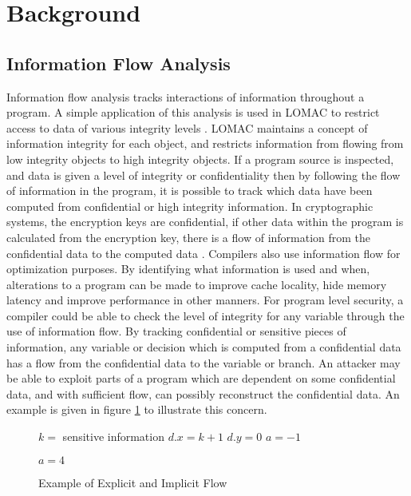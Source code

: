 \section{Background}
\subsection{Information Flow Analysis}
Information flow analysis tracks interactions of information throughout a
program. A simple application of this analysis is used in LOMAC to restrict
access to data of various integrity levels \cite{fraser2000lomac}. LOMAC
maintains a concept of information integrity for each object, and restricts
information from flowing from low integrity objects to high integrity objects.
If a program source is inspected, and data is given a level of integrity or
confidentiality then by following the flow of information in the program, it is
possible to track which data have been computed from confidential or high
integrity information. In cryptographic systems, the encryption keys are
confidential, if other data within the program is calculated from the encryption
key, there is a flow of information from the confidential data to the computed
data \cite{wang2017cached}. Compilers also use information flow for optimization
purposes. By identifying what information is used and when, alterations to a
program can be made to improve cache locality, hide memory latency and improve
performance in other manners. For program level security, a compiler could be
able to check the level of integrity for any variable through the use of
information flow. By tracking confidential or sensitive pieces of information,
any variable or decision which is computed from a confidential data has a flow
from the confidential data to the variable or branch. An attacker may be able to
exploit parts of a program which are dependent on some confidential data, and
with sufficient flow, can possibly reconstruct the confidential data. An example
is given in figure \ref{alg:simpleflow} to illustrate this concern.

\begin{figure}
  \hrulefill
  \begin{algorithmic}
    \State $k =$ sensitive information
    \State $d.x =  k + 1$
    \State $d.y = 0$
    \State $a = -1$

      \State $a = 4$ 
    \EndIf

  \end{algorithmic}
  \hrulefill
  \caption{Example of Explicit and Implicit Flow}
  \label{alg:simpleflow}
\end{figure}

